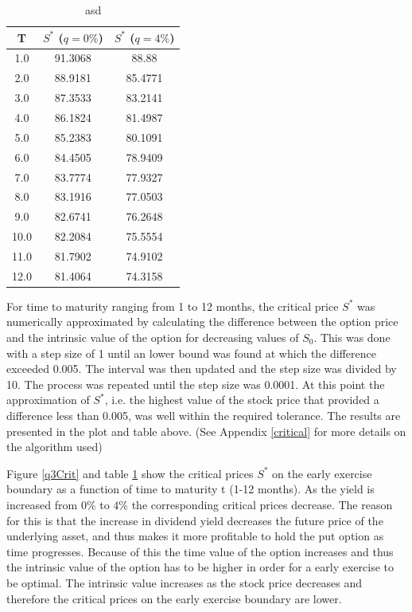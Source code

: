 \documentclass{article}
\begin{document}
\begin{table}[H]
	\begin{center}
		\begin{tabular}{ || c | c | c ||}
		\hline
		T & $S^*$ ($q=0\%$) & $S^*$ ($q = 4\%$)\\ 
		\hline
		1.0 & 91.3068 & 88.88 \\
		2.0 & 88.9181 & 85.4771 \\
		3.0 & 87.3533 & 83.2141 \\
		4.0 & 86.1824 & 81.4987 \\
		5.0 & 85.2383 & 80.1091 \\
		6.0 & 84.4505 & 78.9409 \\
		7.0 & 83.7774 & 77.9327 \\
		8.0 & 83.1916 & 77.0503 \\
		9.0 & 82.6741 & 76.2648 \\
		10.0 & 82.2084 & 75.5554 \\
		11.0 & 81.7902 & 74.9102 \\
		12.0 & 81.4064 & 74.3158 \\
		\hline 
		\end{tabular}
	\end{center}
	\caption{asd}
	\label{q3table}
\end{table}

For time to maturity ranging from 1 to 12 months, the critical price $S^*$ was numerically approximated by calculating the difference between the option price and the intrinsic value of the option for decreasing values of $S_0$. This was done with a step size of 1 until an lower bound was found at which the difference exceeded 0.005. The interval was then updated and the step size was divided by 10. The process was repeated until the step size was 0.0001. At this point the approximation of $S^*$, i.e. the highest value of the stock price that provided a difference less than 0.005, was well within the required tolerance. The results are presented in the plot and table above. (See Appendix \ref{critical} for more details on the algorithm used) 

Figure \ref{q3Crit} and table \ref{q3table} show the critical prices $S^*$ on the early exercise boundary as a function of time to maturity t (1-12 months). As the yield is increased from $0\%$ to $4\%$ the corresponding critical prices decrease. The reason for this is that the increase in dividend yield decreases the future price of the underlying asset, and thus makes it more profitable to hold the put option as time progresses. Because of this the time value of the option increases and thus the intrinsic value of the option has to be higher in order for a early exercise to be optimal. The intrinsic value increases as the stock price decreases and therefore the critical prices on the early exercise boundary are lower. 
\end{document}
